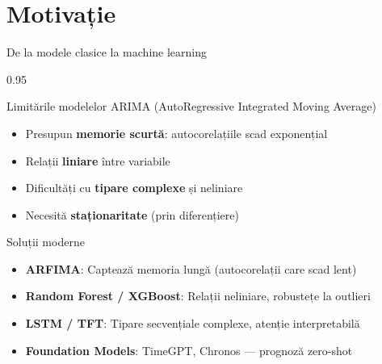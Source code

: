 \documentclass[9pt, aspectratio=169, t]{beamer}
\begin{document}
\section{Motivație}

\begin{frame}{De la modele clasice la machine learning}
    \begin{cminipage}{0.95\textwidth}
        \begin{block}{Limitările modelelor ARIMA (AutoRegressive Integrated Moving Average)}
            \begin{itemize}\setlength{\itemsep}{0pt}
                \item Presupun \textbf{memorie scurtă}: autocorelațiile scad exponențial
                \item Relații \textbf{liniare} între variabile
                \item Dificultăți cu \textbf{tipare complexe} și neliniare
                \item Necesită \textbf{staționaritate} (prin diferențiere)
            \end{itemize}
        \end{block}

        \vspace{0.2cm}

        \begin{alertblock}{Soluții moderne}
            \begin{itemize}\setlength{\itemsep}{0pt}
                \item \textbf{ARFIMA}: Captează memoria lungă (autocorelații care scad lent)
                \item \textbf{Random Forest / XGBoost}: Relații neliniare, robustețe la outlieri
                \item \textbf{LSTM / TFT}: Tipare secvențiale complexe, atenție interpretabilă
                \item \textbf{Foundation Models}: TimeGPT, Chronos --- prognoză zero-shot
            \end{itemize}
        \end{alertblock}
    \end{cminipage}
\end{frame}
\end{document}
